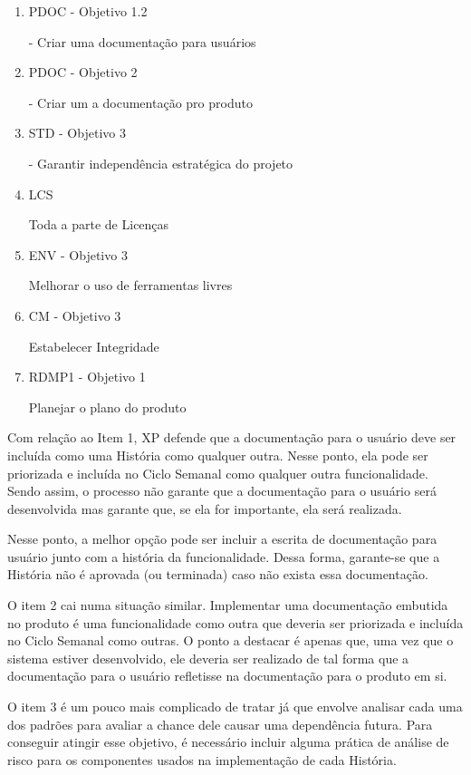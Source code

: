\begin{enumerate}
\item PDOC - Objetivo 1.2

  - Criar uma documentação para usuários

\item PDOC - Objetivo 2

  - Criar um a documentação pro produto

\item STD - Objetivo 3

  - Garantir independência estratégica do projeto

\item LCS

  Toda a parte de Licenças

\item ENV - Objetivo 3

  Melhorar o uso de ferramentas livres

\item CM - Objetivo 3

  Estabelecer Integridade

\item RDMP1 - Objetivo 1

  Planejar o plano do produto
\end{enumerate}

Com relação ao Item 1, XP defende que a documentação para o usuário
deve ser incluída como uma História como qualquer outra. Nesse ponto,
ela pode ser priorizada e incluída no Ciclo Semanal como qualquer
outra funcionalidade. Sendo assim, o processo não garante que a
documentação para o usuário será desenvolvida mas garante que, se ela
for importante, ela será realizada.

Nesse ponto, a melhor opção pode ser incluir a escrita de documentação
para usuário junto com a história da funcionalidade. Dessa forma,
garante-se que a História não é aprovada (ou terminada) caso não
exista essa documentação.

O item 2 cai numa situação similar. Implementar uma documentação
embutida no produto é uma funcionalidade como outra que deveria ser
priorizada e incluída no Ciclo Semanal como outras. O ponto a destacar
é apenas que, uma vez que o sistema estiver desenvolvido, ele deveria
ser realizado de tal forma que a documentação para o usuário
refletisse na documentação para o produto em si.

O item 3 é um pouco mais complicado de tratar já que envolve analisar
cada uma dos padrões para avaliar a chance dele causar uma dependência
futura. Para conseguir atingir esse objetivo, é necessário incluir
alguma prática de análise de risco para os componentes usados na
implementação de cada História.

